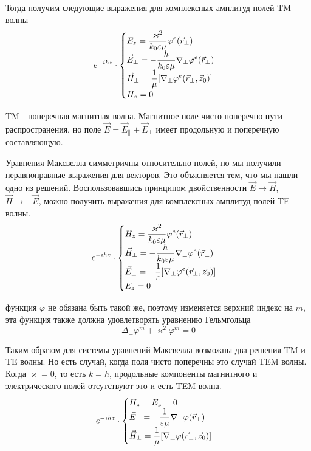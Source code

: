 \documentclass[a4paper,14pt]{extarticle}
\renewcommand{\phi}{\varphi}
\renewcommand{\epsilon}{\varepsilon}
\renewcommand{\kappa}{\varkappa}
\begin{document}
	Тогда получим следующие выражения для комплексных амплитуд полей TM волны 
	\begin{displaymath}
	e^{-ihz}\cdot
	\begin{cases}
	$$\displaystyle E_z = \frac{\kappa^2}{k_0\epsilon\mu}\phi^e(\vec{r}_\perp)$$ \\
	$$\displaystyle\vec{E}_\perp = -\frac{h}{k_0\epsilon\mu}\nabla_\perp\phi^e(\vec{r}_\perp)$$ \\
	$$\displaystyle\vec{H}_\perp = \frac{1}{\mu}[\nabla_\perp\phi^e(\vec{r}_\perp,\vec{z}_0)]$$ \\
	$$\displaystyle H_z = 0$$
	\end{cases}
	\end{displaymath}

	TM - поперечная магнитная волна. Магнитное поле чисто поперечно пути распространения, но поле $\vec{E}=\vec{E}_\parallel+\vec{E}_\perp$ имеет продольную и поперечную составляющую.
	
	Уравнения Максвелла симметричны относительно полей, но мы получили неравноправные выражения для векторов. Это объясняется тем, что мы нашли одно из решений. Воспользовавшись принципом двойственности $\vec{E}\to\vec{H}$, $\vec{H}\to -\vec{E}$, можно получить выражения  для комплексных амплитуд полей TE волны. 
	\begin{displaymath}
	e^{-ihz}\cdot
	\begin{cases}
	$$\displaystyle H_z = \frac{\kappa^2}{k_0\epsilon\mu}\phi^e(\vec{r}_\perp)$$ \\
	$$\displaystyle\vec{H}_\perp = -\frac{h}{k_0\epsilon\mu}\nabla_\perp\phi^e(\vec{r}_\perp)$$ \\
	$$\displaystyle\vec{E}_\perp = -\frac{1}{\epsilon}[\nabla_\perp\phi^e(\vec{r}_\perp,\vec{z}_0)]$$ \\
	$$\displaystyle E_z = 0$$
	\end{cases}
	\end{displaymath}
	
	функция $\phi$ не обязана быть такой же, поэтому изменяется верхний индекс на $m$, эта функция также должна удовлетворять уравнению Гельмгольца  
	$$\Delta_\perp\phi^{m} + \kappa^2\phi^{m}=0$$
	
	Таким образом для системы уравнений Максвелла возможны два решения TM и TE волны. Но есть случай, когда поля чисто поперечны это случай TEM волны.
	Когда $\kappa = 0$, то есть $k=h$, продольные компоненты магнитного и электрического полей отсутствуют это и есть TEM волна.
	\begin{displaymath}
	e^{-ihz}\cdot
	\begin{cases}
	$$\displaystyle H_z = E_z = 0$$ \\
	$$\displaystyle\vec{E}_\perp = -\frac{1}{\epsilon\mu}\nabla_\perp\phi(\vec{r}_\perp)$$ \\
	$$\displaystyle\vec{H}_\perp = \frac{1}{\mu}[\nabla_\perp\phi(\vec{r}_\perp,\vec{z}_0)]$$ 
	\end{cases}
	\end{displaymath}
	
\end{document}
